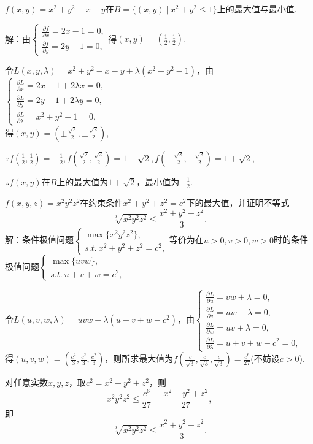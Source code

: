 \documentclass[12pt,UTF8]{ctexart}
\newcommand\Set[2]{\{#1\ \vert\ #2 \}}
\begin{document}
\begin{enumerate}
$f(x,y)=x^2+y^2-x-y$在$B=\Set{(x,y)}{x^2+y^2\leq1}$上的最大值与最小值.

解：由$\begin{cases}
\frac{\partial f}{\partial x}=2x-1=0,\\
\frac{\partial f}{\partial y}=2y-1=0,
\end{cases}$得$(x,y)=(\frac12,\frac12)$,

令$L(x,y,\lambda)=x^2+y^2-x-y+\lambda(x^2+y^2-1)$，由$\begin{cases}
\frac{\partial L}{\partial x}=2x-1+2\lambda x=0,\\
\frac{\partial L}{\partial y}=2y-1+2\lambda y=0,\\
\frac{\partial L}{\partial\lambda}=x^2+y^2-1=0,
\end{cases}$\\
得$(x,y)=(\pm\frac{\sqrt2}2,\pm\frac{\sqrt2}2)$,

$\because f(\frac12,\frac12)=-\frac12,f(\frac{\sqrt2}2,\frac{\sqrt2}2)=1-\sqrt2,f(-\frac{\sqrt2}2,-\frac{\sqrt2}2)=1+\sqrt2$,

$\therefore f(x,y)$在$B$上的最大值为$1+\sqrt2$，最小值为$-\frac12$.

$f(x,y,z)=x^2y^2z^2$在约束条件$x^2+y^2+z^2=c^2$下的最大值，并证明不等式
\[
\sqrt[3]{x^2y^2z^2}\leq\frac{x^2+y^2+z^2}3.
\]
解：条件极值问题$\begin{cases}
\max\{x^2y^2z^2\},\\
s.t.\ x^2+y^2+z^2=c^2,
\end{cases}$等价为在$u>0,v>0,w>0$时的条件极值问题$\begin{cases}
\max\{uvw\},\\
s.t.\ u+v+w=c^2,
\end{cases}$

令$L(u,v,w,\lambda)=uvw+\lambda(u+v+w-c^2)$，由$\begin{cases}
\frac{\partial L}{\partial u}=vw+\lambda=0,\\
\frac{\partial L}{\partial v}=uw+\lambda=0,\\
\frac{\partial L}{\partial w}=uv+\lambda=0,\\
\frac{\partial L}{\partial\lambda}=u+v+w-c^2=0,
\end{cases}$\\
得$(u,v,w)=(\frac{c^2}3,\frac{c^2}3,\frac{c^2}3)$，则所求最大值为$f(\frac{c}{\sqrt3},\frac{c}{\sqrt3},\frac{c}{\sqrt3})=\frac{c^6}{27}$(不妨设$c>0$).

对任意实数$x,y,z$，取$c^2=x^2+y^2+z^2$，则
\[x^2y^2z^2\leq\frac{c^6}{27}=\frac{x^2+y^2+z^2}{27},\]
即
\[\sqrt[3]{x^2y^2z^2}\leq\frac{x^2+y^2+z^2}3.\]


\end{enumerate}
\end{document}
